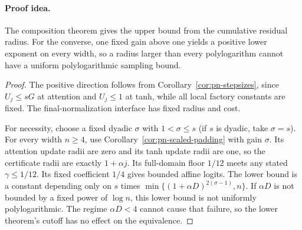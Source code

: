 \paragraph{Proof idea.}
The composition theorem gives the upper bound from the cumulative
residual radius. For the converse, one fixed gain above one yields a
positive lower exponent on every width, so a radius larger than every
polylogarithm cannot have a uniform polylogarithmic sampling bound.

\begin{proof}
The positive direction follows from
Corollary~\ref{cor:pn-stepsizes}, since $U_j\le sG$ at attention and
$U_j\le1$ at tanh, while all local factory constants are fixed.
The final-normalization interface has fixed radius and cost.

For necessity, choose a fixed dyadic $\sigma$ with $1<\sigma\le s$
(if $s$ is dyadic, take $\sigma=s$). For every width $n\ge4$,
use Corollary~\ref{cor:pn-scaled-padding} with gain $\sigma$. Its attention update
radii are zero and its tanh update radii are one, so the certificate
radii are exactly $1+\alpha j$. Its full-domain floor $1/12$ meets
any stated $\gamma\le1/12$. Its fixed coefficient $1/4$ gives bounded
affine logits. The lower bound is a constant depending only on $s$
times $\min\{(1+\alpha D)^{2(\sigma-1)},n\}$. If $\alpha D$ is not bounded
by a fixed power of $\log n$, this lower bound is not uniformly
polylogarithmic. The regime $\alpha D<4$ cannot cause that failure,
so the lower theorem's cutoff has no effect on the equivalence.
\end{proof}
